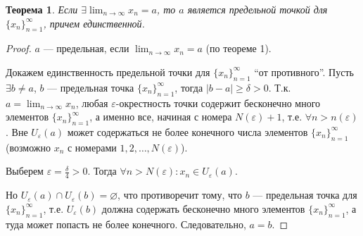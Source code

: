 \documentclass[a4paper,12pt]{article} %
\newtheorem{theorem}{Теорема}[section]
\theoremstyle{remark}
\theoremstyle{definition}
\begin{document}
\begin{theorem}
	Если $\displaystyle \exists \lim_{n \to \infty} x_n = a$, то $a$ является предельной точкой для $\{x_n\}_{n=1}^{\infty}$,
    причем единственной.
\end{theorem}

\begin{proof}
	$a$ --- предельная, если $\displaystyle \lim_{n \to \infty} x_n = a$ (по теореме 1).

Докажем единственность предельной точки для $\{x_n\}_{n=1}^{\infty}$ ``от противного''. 
Пусть $\exists b\neq a$, $b$ --- предельная точка $\{x_n\}_{n=1}^{\infty}$, тогда $|b-a|\ge \delta>0$. 
Т.к. $\displaystyle a=\lim_{n \to \infty} x_n$, любая $\varepsilon$-окрестность точки содержит бесконечно много элементов
$\{x_n\}_{n=1}^{\infty}$, а именно все, начиная с номера $N(\varepsilon) + 1$, т.е. $\forall n>n(\varepsilon)$.
Вне $U_\varepsilon(a)$ может содержаться не более конечного числа элементов $\{x_n\}_{n=1}^{\infty}$
(возможно $x_n$ с номерами $1, 2, \ldots, N(\varepsilon)$).

Выберем $\varepsilon=\frac{\delta}{4} > 0$. Тогда $\forall n>N(\varepsilon) : x_n \in  U_\varepsilon(a)$. 

\begin{center}
\end{center}

Но $U_\varepsilon(a)\cap U_\varepsilon(b) = \varnothing$, что противоречит тому, что $b$ --- предельная точка для $\{x_n\}_{n=1}^{\infty}$, т.е. $U_\varepsilon(b)$ должна содержать бесконечно много элементов $\{x_n\}_{n=1}^{\infty}$, а туда может попасть не более конечного. Следовательно, $a = b$.
\end{proof}
\end{document}
